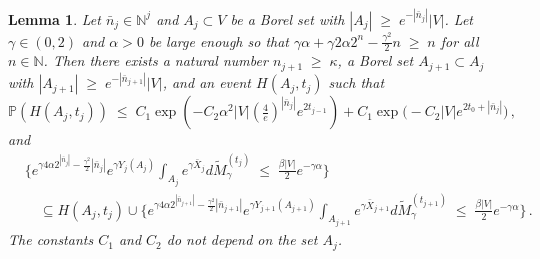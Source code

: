 \documentclass[11pt]{article}
\numberwithin{equation}{section}
\newtheorem{lemma}[theorem]{Lemma}
\theoremstyle{definition}
\renewcommand{\tilde}{\widetilde}          %
\renewcommand{\leq}{\;\leqslant\;}                   %
\renewcommand{\geq}{\;\geqslant\;}                   %
\newcommand{\N}{\mathbb{N}}
\renewcommand{\P}{\mathbb{P}}
\newcommand{\ab}{|}
\newcommand{\grea}{>}
\newcommand{\Pb}{\P}
\begin{document}
\begin{lemma}\label{iteration}
Let $\bar n_j \in \N^{j}$ and $A_j \subset V$ be a Borel set with $\ab A_j \ab \geq e^{-\ab \bar n_j \ab } \ab V \ab $. Let $\gamma \in (0,2)$ and $\alpha \grea 0$ be large enough so that $\gamma \alpha + \gamma 2 \alpha 2^n - \frac{\gamma^2}{2} n \geq n$ for all $n \in \N$. Then there exists a natural number $n_{j+1} \geq \kappa$, a  Borel set $A_{j+1} \subset A_j$ with $\ab A_{j+1} \ab \geq e^{- \ab \bar n_{j+1} \ab} \ab V \ab$, and an event $H(A_j,t_j)$ such that 
\[
  \Pb (H(A_j,t_j)) \leq C_1 \exp(-C_2 \alpha^2 \ab V \ab  (\tfrac{4}{e})^{| \bar n_j|} e^{2t_{j-1}}) +  C_1 \exp \big( -C_2 \ab V \ab  e^{2 t_0 + | \bar n_{j}|} \big) \,,
  \]
  and
\begin{align*}
  & \{ e^{\gamma 4\alpha 2^{| \bar n_{j} | }  - \frac{\gamma^2}{2} |\bar n_{j}| } e^{\gamma Y_{j}(A_j)}\int_{A_{j}} e^{\gamma \bar X_{j}} d \tilde M_\gamma^{(t_{j})} \leq \tfrac{\beta \ab V \ab }{2} e^{-\gamma \alpha}\}  \\
    &\quad \subseteq H(A_j,t_j) \cup  \{ e^{\gamma 4 \alpha 2^{| \bar n_{j+1} | }  - \frac{\gamma^2}{2} |\bar n_{j+1}| } e^{\gamma Y_{j+1}(A_{j+1})}\int_{A_{j+1}} e^{\gamma \bar X_{j+1}} d \tilde M_\gamma^{(t_{j+1})}\leq \tfrac{\beta \ab V \ab }{2} e^{-\gamma \alpha} \}\,.
  \end{align*}
The constants $C_1$ and $C_2$ do not depend on the set $A_j$.

\end{lemma}
\end{document}
